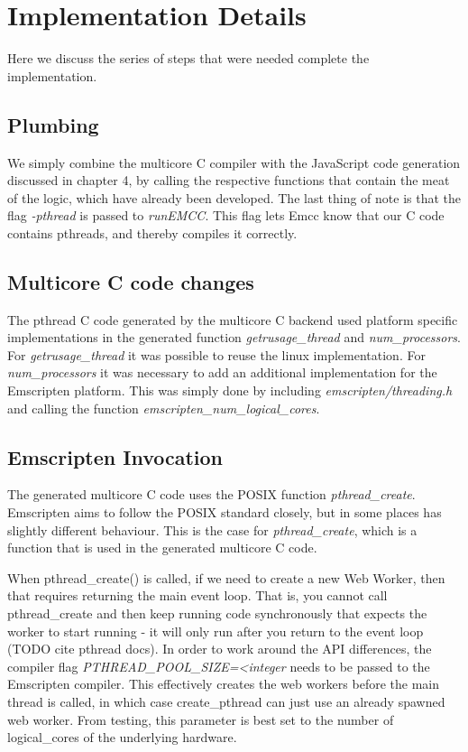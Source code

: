 \documentclass[11pt]{book}
\begin{document}
\section{Implementation Details}
Here we discuss the series of steps that were needed complete the implementation.
\subsection{Plumbing}

We simply combine the multicore C compiler with the JavaScript code generation discussed in chapter 4, by calling the respective functions that contain the meat of the logic, which have already been developed. The last thing of note is that the flag \textit{-pthread} is passed to \textit{runEMCC}. This flag lets Emcc know that our C code contains pthreads, and thereby compiles it correctly.


\subsection{Multicore C code changes}
The pthread C code generated by the multicore C backend used platform specific implementations in the generated function \textit{getrusage\_thread} and \textit{num\_processors}. For \textit{getrusage\_thread} it was possible to reuse the linux implementation. For \textit{num\_processors} it was necessary to add an additional implementation for the Emscripten platform. This was simply done by including \textit{emscripten/threading.h} and calling the function \textit{emscripten\_num\_logical\_cores}.




\subsection{Emscripten Invocation}

The generated multicore C code uses the POSIX function \textit{pthread\_create}. Emscripten aims to follow the POSIX standard closely, but in some places has slightly different behaviour. This is the case for \textit{pthread\_create}, which is a function that is used in the generated multicore C code. 

When pthread\_create() is called, if we need to create a new Web Worker, then that requires returning the main event loop. That is, you cannot call pthread\_create and then keep running code synchronously that expects the worker to start running - it will only run after you return to the event loop (TODO cite pthread docs). In order to work around the API differences, the compiler flag \textit{PTHREAD\_POOL\_SIZE=<integer} needs to be passed to the Emscripten compiler. This effectively creates the web workers before the main thread is called, in which case create\_pthread can just use an already spawned web worker. From testing, this parameter is best set to the number of logical\_cores of the underlying hardware.
\end{document}
